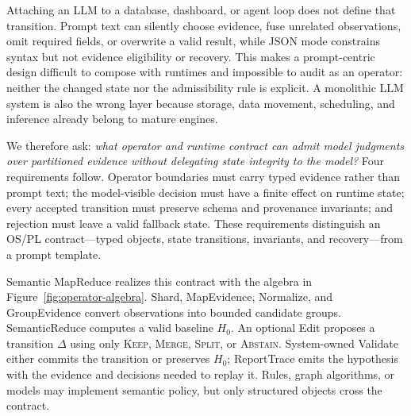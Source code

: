 \documentclass[sigplan,anonymous,nonacm]{acmart}
\newcommand{\systemname}{Semantic MapReduce}
\begin{document}
Attaching an LLM to a database, dashboard, or agent loop does not define that transition. Prompt text can silently choose evidence, fuse unrelated observations, omit required fields, or overwrite a valid result, while JSON mode constrains syntax but not evidence eligibility or recovery. This makes a prompt-centric design difficult to compose with runtimes and impossible to audit as an operator: neither the changed state nor the admissibility rule is explicit. A monolithic LLM system is also the wrong layer because storage, data movement, scheduling, and inference already belong to mature engines.

We therefore ask: \emph{what operator and runtime contract can admit model judgments over partitioned evidence without delegating state integrity to the model?} Four requirements follow. Operator boundaries must carry typed evidence rather than prompt text; the model-visible decision must have a finite effect on runtime state; every accepted transition must preserve schema and provenance invariants; and rejection must leave a valid fallback state. These requirements distinguish an OS/PL contract---typed objects, state transitions, invariants, and recovery---from a prompt template.

\systemname{} realizes this contract with the algebra in Figure~\ref{fig:operator-algebra}. \textsf{Shard}, \textsf{MapEvidence}, \textsf{Normalize}, and \textsf{GroupEvidence} convert observations into bounded candidate groups. \textsf{SemanticReduce} computes a valid baseline $H_0$. An optional \textsf{Edit} proposes a transition $\Delta$ using only \textsc{Keep}, \textsc{Merge}, \textsc{Split}, or \textsc{Abstain}. System-owned \textsf{Validate} either commits the transition or preserves $H_0$; \textsf{ReportTrace} emits the hypothesis with the evidence and decisions needed to replay it. Rules, graph algorithms, or models may implement semantic policy, but only structured objects cross the contract.
\end{document}
